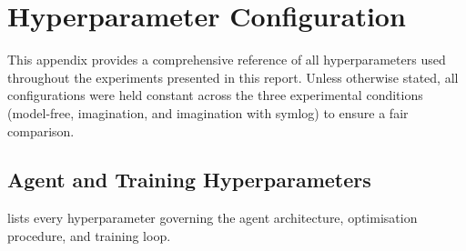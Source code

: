 \chapter{Hyperparameter Configuration}
\label{appn:A}

This appendix provides a comprehensive reference of all hyperparameters used throughout the experiments presented in this report. Unless otherwise stated, all configurations were held constant across the three experimental conditions (model-free, imagination, and imagination with symlog) to ensure a fair comparison.

\section{Agent and Training Hyperparameters}

 lists every hyperparameter governing the agent architecture, optimisation procedure, and training loop.

